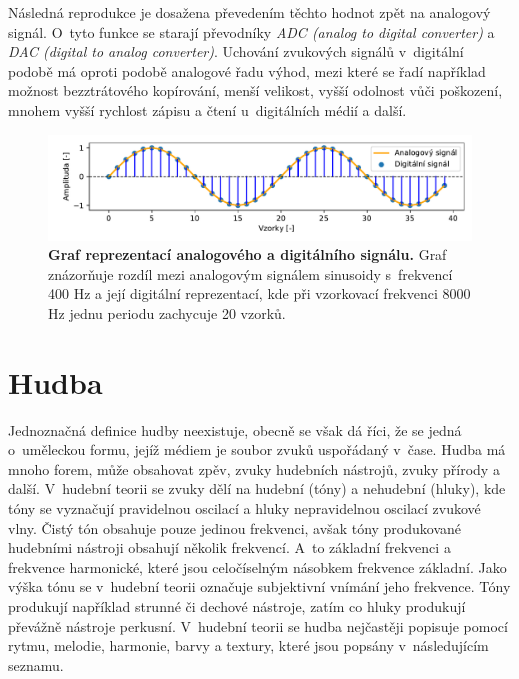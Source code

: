 Následná reprodukce je dosažena převedením těchto hodnot zpět na analogový signál. O~tyto funkce se starají převodníky \textit{ADC (analog to digital converter)} a \textit{DAC (digital to analog converter)}. Uchování zvukových signálů v~digitální podobě má oproti podobě analogové řadu výhod, mezi které se řadí například možnost bezztrátového kopírování, menší velikost, vyšší odolnost vůči poškození, mnohem vyšší rychlost zápisu a čtení u~digitálních médií a další.\cite{dsp}

\begin{figure}[h]
    \centering
    \includegraphics[width=\textwidth]{obrazky/vzorkovany_signal.pdf}
    \caption{\textbf{Graf reprezentací analogového a digitálního signálu.} Graf znázorňuje rozdíl mezi analogovým signálem sinusoidy s~frekvencí 400 Hz a její digitální reprezentací, kde při vzorkovací frekvenci 8000 Hz jednu periodu zachycuje 20 vzorků.}
    \label{obr_vzorkovany_signal}
\end{figure}

\section{Hudba}
\label{hudba}
Jednoznačná definice hudby neexistuje, obecně se však dá říci, že se jedná o~uměleckou formu, jejíž médiem je soubor zvuků uspořádaný v~čase. Hudba má mnoho forem, může obsahovat zpěv, zvuky hudebních nástrojů, zvuky přírody a další. V~hudební teorii se zvuky dělí na hudební (tóny) a nehudební (hluky), kde tóny se vyznačují pravidelnou oscilací a hluky nepravidelnou oscilací zvukové vlny. Čistý tón obsahuje pouze jedinou frekvenci, avšak tóny produkované hudebními nástroji obsahují několik frekvencí. A~to základní frekvenci a frekvence harmonické, které jsou celočíselným násobkem frekvence základní. Jako výška tónu se v~hudební teorii označuje subjektivní vnímání jeho frekvence. Tóny produkují například strunné či dechové nástroje, zatím co hluky produkují převážně nástroje perkusní. V~hudební teorii se hudba nejčastěji popisuje pomocí rytmu, melodie, harmonie, barvy a textury, které jsou popsány v~následujícím seznamu.\cite{music_theory}\cite{MIR}

